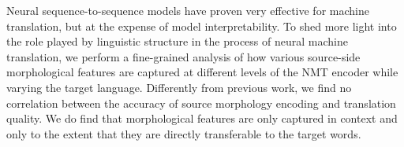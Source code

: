 Neural sequence-to-sequence models have proven very effective for machine translation, but at the expense of model interpretability. To shed more light into the role played by linguistic structure in the process of neural machine translation, we perform a fine-grained analysis of how various source-side morphological features are captured at different levels of the NMT encoder while varying the target language. Differently from previous work, we find no correlation between the accuracy of source morphology encoding and translation quality. We do find that morphological features are only captured in context and only to the extent that they are directly transferable to the target words.
